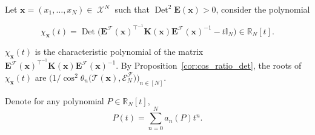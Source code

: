 \documentclass[twoside,11pt]{book}
\numberwithin{theorem}{chapter}
\numberwithin{definition}{chapter}
\numberwithin{proposition}{chapter}
\numberwithin{corollary}{chapter}
\numberwithin{example}{chapter}
\numberwithin{lemma}{chapter}
\numberwithin{assumption}{chapter}
\DeclareMathOperator{\Tr}{Tr}
\DeclareMathOperator{\Det}{Det}
\DeclareMathOperator{\Tran}{\intercal}
\DeclareMathOperator{\X}{\mathcal{X}}
\begin{document}
Let $\bm{x} = (x_{1}, \dots, x_{N}) \in \X^{N}$ such that $\Det^{2} \bm{E}(\bm{x}) > 0$, consider the polynomial 

\begin{equation}
\chi_{\bm{x}}(t) = \Det \Big( \bm{E}^{\mathcal{F}}(\bm{x})^{\Tran^{-1}}\bm{K}(\bm{x})\bm{E}^{\mathcal{F}}(\bm{x})^{-1}  - t \mathbb{I}_{N} \Big) \in \mathbb{R}_{N}[t].
\end{equation}


$\chi_{\bm{x}}(t)$ is the characteristic polynomial of the matrix $\bm{E}^{\mathcal{F}}(\bm{x})^{\Tran^{-1}}\bm{K}(\bm{x})\bm{E}^{\mathcal{F}}(\bm{x})^{-1}$. By Proposition~\ref{cor:cos_ratio_det}, the roots of $\chi_{\bm{x}}(t)$ are  $\Big(1/\cos^{2} \theta_{n}\big(\mathcal{T}(\bm{x}), \mathcal{E}_{N}^{\mathcal{F}} \big) \Big)_{n \in [N]}$.

Denote for any polynomial $P \in \mathbb{R}_{N}[t]$,
\begin{equation}
P(t) = \sum\limits_{n = 0}^{N} a_{n}(P)t^{n}.
\end{equation}
\end{document}
